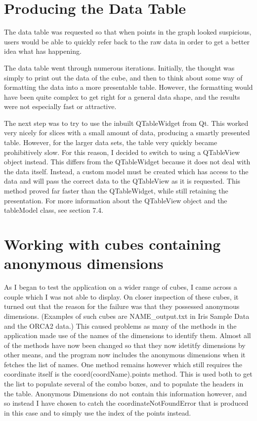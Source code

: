 \documentclass[whitecover]{MO_report}
\begin{document}
\section{Producing the Data Table}

The data table was requested so that when points in the graph looked suspicious,
users would be able to quickly refer back to the raw data in order to get a
better idea what has happening.

The data table went through numerous iterations. Initially, the thought was
simply to print out the data of the cube, and then to think about some way
of formatting the data into a more presentable table. However, the formatting
would have been quite complex to get right for a general data shape, and the
results were not especially fast or attractive.

The next step was to try to use the inbuilt QTableWidget from Qt. This worked
very nicely for slices with a small amount of data, producing a smartly
presented table. However, for the larger data sets, the table very quickly
became prohibitively slow. For this reason, I decided to switch to using a
QTableView object instead. This differs from the QTableWidget because it does
not deal with the data itself. Instead, a custom model must be created which
has access to the data and will pass the correct data to the QTableView as it
is requested. This method proved far faster than the QTableWidget, while still
retaining the presentation. For more information about the QTableView object
and the tableModel class, see section 7.4.

\section{Working with cubes containing anonymous dimensions}

As I began to test the application on a wider range of cubes, I came across a
couple which I was not able to display. On closer inspection of these cubes,
it turned out that the reason for the failure was that they possessed anonymous
dimensions. (Examples of such cubes are NAME\_output.txt in Iris Sample Data
and the ORCA2 data.) This caused problems as many of the methods in the application
made use of the names of the dimensions to identify them. Almost all of the
methods have now been changed so that they now idetitfy dimensions by other
means, and the program now includes the anonymous dimensions when it fetches
the list of names. One method remains however which still requires the
coordinate itself is the coord(coordName).points method. This is used both to
get the list to populate several of the combo boxes, and to populate the
headers in the table. Anonymous Dimensions do not contain this information
however, and so instead I have chosen to catch the coordinateNotFoundError
that is produced in this case and to simply use the index of the points instead.
\end{document}
